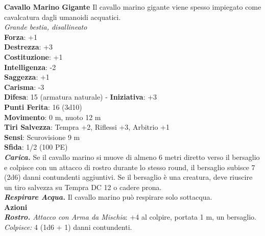\begin{multicols}{2}
\medskip\textbf{Cavallo Marino Gigante}
Il cavallo marino gigante viene spesso impiegato come cavalcatura dagli umanoidi acquatici.\\
\emph{Grande bestia, disallineato}\\
\textbf{Forza}: +1\\
\textbf{Destrezza}: +3\\
\textbf{Costituzione}: +1\\
\textbf{Intelligenza}: -2\\
\textbf{Saggezza}: +1\\
\textbf{Carisma}: -3\\
\textbf{Difesa}: 15 (armatura naturale) - \textbf{Iniziativa}: +3\\
\textbf{Punti Ferita}: 16 (3d10)\\
\textbf{Movimento}: 0 m, nuoto 12 m\\
\textbf{Tiri Salvezza}: Tempra +2, Riflessi +3, Arbitrio +1 \\
\textbf{Sensi}: Scurovisione 9 m\\
\textbf{Sfida}: 1/2 (100 PE)\smallskip\\
\emph{\textbf{Carica.}} Se il cavallo marino si muove di almeno 6 metri diretto verso il bersaglio e colpisce con un attacco di rostro durante lo stesso round, il bersaglio subisce 7 (2d6) danni contundenti aggiuntivi. Se il bersaglio è una creatura, deve riuscire un tiro salvezza su Tempra DC  12 o cadere prona.\\
\emph{\textbf{Respirare Acqua.}} Il cavallo marino può respirare solo sottacqua.\\
\smallskip\textbf{Azioni}\\
\emph{\textbf{Rostro.} Attacco con Arma da Mischia}: +4 al colpire, portata 1 m, un bersaglio.\\
\emph{Colpisce:} 4 (1d6 + 1) danni contundenti.\\


\end{multicols}
